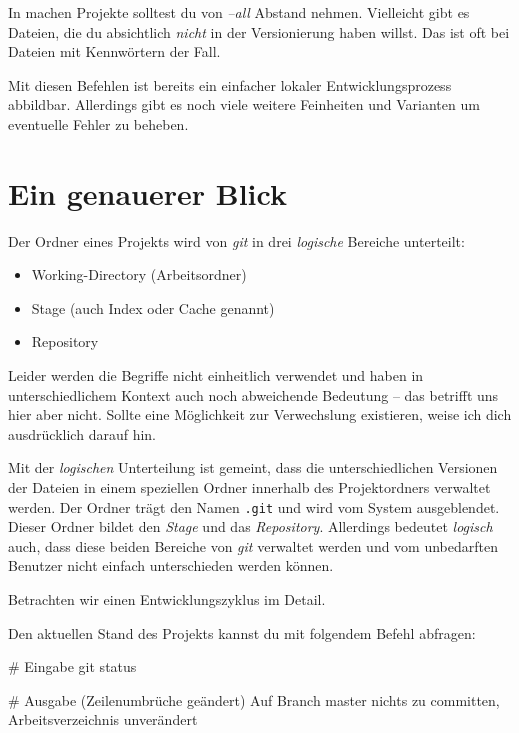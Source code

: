 \documentclass[
  letterpaper,
  DIV=11]{scrreprt}
\newenvironment{Shaded}{\begin{snugshade}}{\end{snugshade}}
\newcommand{\CommentTok}[1]{\textcolor[rgb]{0.37,0.37,0.37}{#1}}
\newcommand{\ExtensionTok}[1]{\textcolor[rgb]{0.00,0.23,0.31}{#1}}
\newcommand{\FunctionTok}[1]{\textcolor[rgb]{0.28,0.35,0.67}{#1}}
\newcommand{\NormalTok}[1]{\textcolor[rgb]{0.00,0.23,0.31}{#1}}
\providecommand{\tightlist}{%
  \setlength{\itemsep}{0pt}\setlength{\parskip}{0pt}}\usepackage{longtable,booktabs,array}
\newcommand{\git}{\textit{git}\xspace}
\begin{document}
In machen Projekte solltest du von \emph{--all} Abstand nehmen.
Vielleicht gibt es Dateien, die du absichtlich \emph{nicht} in der
Versionierung haben willst. Das ist oft bei Dateien mit Kennwörtern der
Fall. \sampleend

Mit diesen Befehlen ist bereits ein einfacher lokaler
Entwicklungsprozess abbildbar. Allerdings gibt es noch viele weitere
Feinheiten und Varianten um eventuelle Fehler zu beheben.

\section{Ein genauerer Blick}\label{ein-genauerer-blick}

Der Ordner eines Projekts wird von \git in drei \emph{logische} Bereiche
unterteilt:

\begin{itemize}
\tightlist
\item
  Working-Directory (Arbeitsordner)
\item
  Stage (auch Index oder Cache genannt)
\item
  Repository
\end{itemize}

Leider werden die Begriffe nicht einheitlich verwendet und haben in
unterschiedlichem Kontext auch noch abweichende Bedeutung -- das
betrifft uns hier aber nicht. Sollte eine Möglichkeit zur Verwechslung
existieren, weise ich dich ausdrücklich darauf hin.

Mit der \emph{logischen} Unterteilung ist gemeint, dass die
unterschiedlichen Versionen der Dateien in einem speziellen Ordner
innerhalb des Projektordners verwaltet werden. Der Ordner trägt den
Namen \texttt{.git} und wird vom System ausgeblendet. Dieser Ordner
bildet den \emph{Stage} und das \emph{Repository}. Allerdings bedeutet
\emph{logisch} auch, dass diese beiden Bereiche von \git verwaltet
werden und vom unbedarften Benutzer nicht einfach unterschieden werden
können.

Betrachten wir einen Entwicklungszyklus im Detail.

Den aktuellen Stand des Projekts kannst du mit folgendem Befehl
abfragen:

\begin{Shaded}
\begin{Highlighting}[]
\CommentTok{\# Eingabe}
\FunctionTok{git}\NormalTok{ status}

\CommentTok{\# Ausgabe (Zeilenumbrüche geändert)}
\ExtensionTok{Auf}\NormalTok{ Branch master}
\ExtensionTok{nichts}\NormalTok{ zu committen, }
\ExtensionTok{Arbeitsverzeichnis}\NormalTok{ unverändert}
\end{Highlighting}
\end{Shaded}
\end{document}
